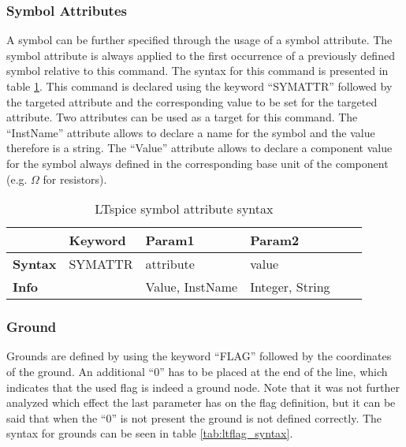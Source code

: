 \subsubsection{Symbol Attributes}

A symbol can be further specified through the usage of a symbol attribute.
The symbol attribute is always applied to the first occurrence of a previously defined symbol relative to this command.
The syntax for this command is presented in table \ref{tab:ltsymattr_syntax}.
This command is declared using the keyword ``SYMATTR'' followed by the targeted attribute and the corresponding value to be set for the targeted attribute.
Two attributes can be used as a target for this command.
The ``InstName'' attribute allows to declare a name for the symbol and the value therefore is a string.
The ``Value'' attribute allows to declare a component value for the symbol always defined in the corresponding base unit of the component (e.g. $\Omega$ for resistors).

\begin{table}[H]
\begin{center}

\begin{tabular}{l|l|l|l|l|l}
    & \textbf{Keyword} & \textbf{Param1} & \textbf{Param2}\\
    \hline
    \textbf{Syntax} & SYMATTR & attribute & value\\
    \textbf{Info} & & Value, InstName & Integer, String\\
\end{tabular}
\caption{LTspice symbol attribute syntax}
\label{tab:ltsymattr_syntax}

\end{center}
\end{table}

\subsubsection{Ground}

Grounds are defined by using the keyword ``FLAG'' followed by the coordinates of the ground.
An additional ``0'' has to be placed at the end of the line, which indicates that the used flag is indeed a ground node.
Note that it was not further analyzed which effect the last parameter has on the flag definition, but it can be said that when the ``0'' is not present the ground is not defined correctly.
The syntax for grounds can be seen in table \ref{tab:ltflag_syntax}.

